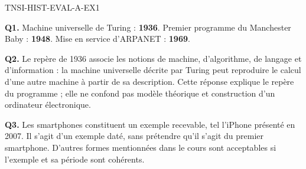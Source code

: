 \begin{corrige}{TNSI-HIST-EVAL-A-EX1}

\textbf{Q1.} Machine universelle de Turing : \textbf{1936}.
Premier programme du Manchester Baby : \textbf{1948}.
Mise en service d'ARPANET : \textbf{1969}.

\textbf{Q2.} Le repère de 1936 associe les notions de machine, d'algorithme,
de langage et d'information : la machine universelle décrite par Turing
peut reproduire le calcul d'une autre machine à partir de sa description.
Cette réponse explique le repère du programme ; elle ne confond pas modèle
théorique et construction d'un ordinateur électronique.

\textbf{Q3.} Les smartphones constituent un exemple recevable, tel l'iPhone
présenté en 2007. Il s'agit d'un exemple daté, sans prétendre qu'il s'agit du
premier smartphone. D'autres formes mentionnées dans le cours sont acceptables
si l'exemple et sa période sont cohérents.

\end{corrige}

